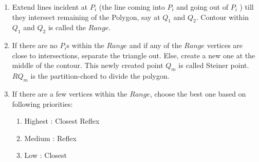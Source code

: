 \begin{enumerate}
\item 
Extend lines incident at $P_i$ (the line coming into $P_i$ and going out of $P_i$ ) till they intersect remaining of the Polygon, say at $Q_1$ and $Q_2$. Contour within $Q_1$ and $Q_2$ is called the $Range$. %


\item 
If there are no $P_i$s within the $Range$ and if any of the $Range$ vertices are close to intersections, separate the triangle out. Else, create a new one at the middle of the contour. This newly created point  $Q_m$ is called Steiner point.  $RQ_m$ is the partition-chord to divide the polygon. %


\item 
If there are a few vertices within the $Range$, choose the best one based on following priorities:
\begin{enumerate}
[noitemsep,topsep=2pt,parsep=2pt,partopsep=2pt,leftmargin=*]
\item Highest : Closest Reflex
\item Medium : Reflex 
\item Low : Closest 
\end{enumerate} 


\end{enumerate}
